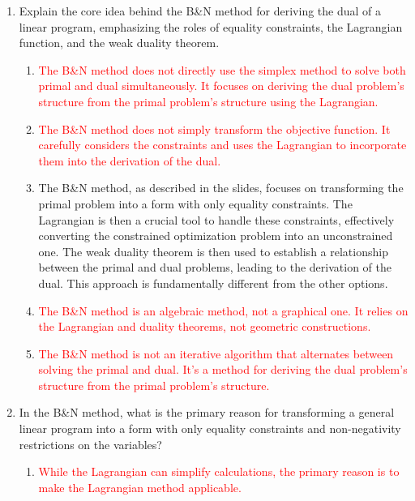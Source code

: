 \documentclass{article}%
\newcommand{\incorrect}[1]{\textcolor{red}{#1}}
\begin{document}
\begin{enumerate}
\begin{enumerate}
\item The dual problem is derived by setting the gradient of the Lagrangian with respect to the primal variables to zero.  This condition ensures that the dual objective function is finite; otherwise, it's unbounded.%
\end{enumerate}%
\vspace{1em}%
\item Explain the core idea behind the B\&N method for deriving the dual of a linear program, emphasizing the roles of equality constraints, the Lagrangian function, and the weak duality theorem.%
\begin{enumerate}%
\item \incorrect{The B\&N method does not directly use the simplex method to solve both primal and dual simultaneously.  It focuses on deriving the dual problem's structure from the primal problem's structure using the Lagrangian.}%
\item \incorrect{The B\&N method does not simply transform the objective function.  It carefully considers the constraints and uses the Lagrangian to incorporate them into the derivation of the dual.}%
\item The B\&N method, as described in the slides, focuses on transforming the primal problem into a form with only equality constraints.  The Lagrangian is then a crucial tool to handle these constraints, effectively converting the constrained optimization problem into an unconstrained one.  The weak duality theorem is then used to establish a relationship between the primal and dual problems, leading to the derivation of the dual.  This approach is fundamentally different from the other options.%
\item \incorrect{The B\&N method is an algebraic method, not a graphical one.  It relies on the Lagrangian and duality theorems, not geometric constructions.}%
\item \incorrect{The B\&N method is not an iterative algorithm that alternates between solving the primal and dual. It's a method for deriving the dual problem's structure from the primal problem's structure.}%
\end{enumerate}%
\vspace{1em}%
\item In the B&N method, what is the primary reason for transforming a general linear program into a form with only equality constraints and non-negativity restrictions on the variables?%
\begin{enumerate}%
\item \incorrect{While the Lagrangian can simplify calculations, the primary reason is to make the Lagrangian method applicable.}%

\end{enumerate}
\end{enumerate}
\end{document}
